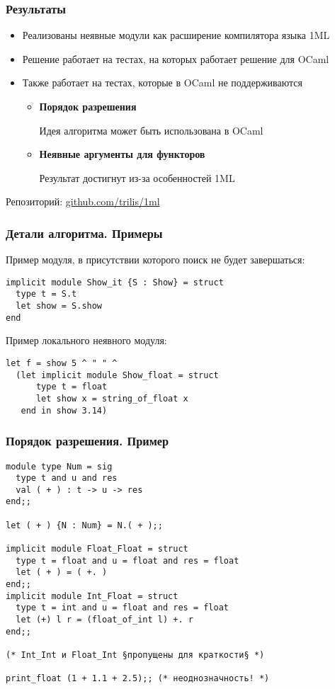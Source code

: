 \documentclass{beamer}
\newcommand{\backupbegin}{
   \newcounter{framenumberappendix}
   \setcounter{framenumberappendix}{\value{framenumber}}
}
\begin{document}
\begin{frame}\frametitle{Результаты}
\begin{itemize}
    \item Реализованы неявные модули как расширение компилятора языка 1ML
    \item Решение работает на тестах, на которых работает решение для OCaml
    \item Также работает на тестах, которые в OCaml не поддерживаются
    \begin{itemize}
        \item \textbf{Порядок разрешения}

        Идея алгоритма может быть использована в OCaml
        \item \textbf{Неявные аргументы для функторов}

        Результат достигнут из-за особенностей 1ML
    \end{itemize}
\end{itemize}
Репозиторий: \url{github.com/trilis/1ml}
\end{frame}

\appendix
\backupbegin

\lstset{language=caml}
\begin{frame}[fragile]\frametitle{Детали алгоритма. Примеры}
Пример модуля, в присутствии которого поиск не будет завершаться:
\begin{lstlisting}
implicit module Show_it {S : Show} = struct
  type t = S.t
  let show = S.show
end
\end{lstlisting}
Пример локального неявного модуля:
\begin{lstlisting}
let f = show 5 ^ " " ^
  (let implicit module Show_float = struct
      type t = float
      let show x = string_of_float x
   end in show 3.14)
\end{lstlisting}
\end{frame}

\lstset{language=caml}
\begin{frame}[fragile]\frametitle{Порядок разрешения. Пример}
\begin{lstlisting}
module type Num = sig
  type t and u and res
  val ( + ) : t -> u -> res
end;;

let ( + ) {N : Num} = N.( + );;

implicit module Float_Float = struct
  type t = float and u = float and res = float
  let ( + ) = ( +. )
end;;
implicit module Int_Float = struct
  type t = int and u = float and res = float
  let (+) l r = (float_of_int l) +. r
end;;

(* Int_Int и Float_Int §пропущены для краткости§ *)

print_float (1 + 1.1 + 2.5);; (* неоднозначность! *)
\end{lstlisting}
\end{frame}
\end{document}

